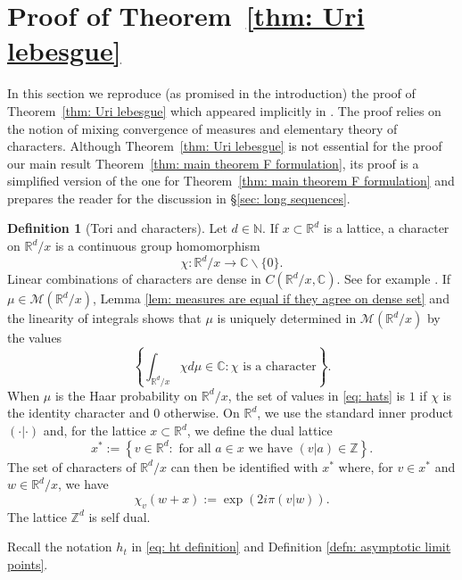 \documentclass[reqno,11pt, twoside]{amsart}
\theoremstyle{plain}
\theoremstyle{definition}
\newtheorem{defn}[thm]{Definition}
\theoremstyle{definition}
\theoremstyle{remark}
\numberwithin{equation}{section}
\newcommand{\R}{{\mathbb{R}}}
\newcommand{\Co}{{\mathbb{C}}}
\newcommand{\Z}{{\mathbb{Z}}}
\newcommand{\N}{{\mathbb{N}}}
\begin{document}
\section{Proof of Theorem~\ref{thm: Uri lebesgue}}\label{sec: proof for Lebesuge}
In this section we reproduce (as promised in the introduction) the proof of 
Theorem~\ref{thm: Uri lebesgue} which appeared implicitly in \cite{GDV}. The proof relies on the notion of mixing convergence of measures and elementary theory of characters.
Although Theorem~\ref{thm: Uri lebesgue} is not essential for the proof our main result Theorem~\ref{thm: main theorem F formulation}, its proof is a simplified version of the one for Theorem~\ref{thm: main theorem F formulation} and prepares the reader for the discussion in 
\S\ref{sec: long sequences}.
\begin{defn}[Tori and characters]\label{defn: characters on tori}
    Let $d \in \N$. If $x \subset \R^d$ is a lattice, a character on $\R^d/x$ is a continuous group homomorphism
    \begin{equation*}
        \chi : \R^d/x \to \Co\smallsetminus \{0\}.
    \end{equation*}
    Linear combinations of characters are dense in $C(\R^d/x,\Co)$. See for example \cite[4.24]{Ru-RACA}.
If $\mu \in \mathcal{M}(\R^d/x)$, Lemma \ref{lem: measures are equal if they agree on dense set} and the linearity of integrals shows that $\mu$ is uniquely determined in $\mathcal{M}(\R^d/x)$ by the values 
\begin{equation}\label{eq: hats}
    \left\lbrace \int_{\R^d/x} \chi d\mu \in \Co: \chi \text{ is a character}\right\rbrace.
\end{equation} 
When $\mu$ is the Haar probability on $\R^d/x$, the set of values in \eqref{eq: hats} is $1$ if $\chi$ is the identity character and $0$ otherwise.
On $\R^d$, we use the standard inner product $(\cdot| \cdot)$ and, for the lattice $x \subset \R^d$, we define the dual lattice
\begin{equation*}
    x^* := \left\lbrace v \in \R^d: \text{ for all } a \in x \text{ we have } (v|a) \in \Z \right\rbrace.
\end{equation*}
The set of characters of $\R^d/x$ can then be identified with $x^*$ where, for $v \in x^*$ and $w\in \R^d/x$, we have
\begin{equation*}
    \chi_v(w+x) := \exp\left(2i\pi (v|w) \right).
\end{equation*} 
    The lattice $\Z^d$ is self dual.
\end{defn}
Recall the notation $h_t$ in \eqref{eq: ht definition} and Definition \ref{defn: asymptotic limit points}.
\end{document}
